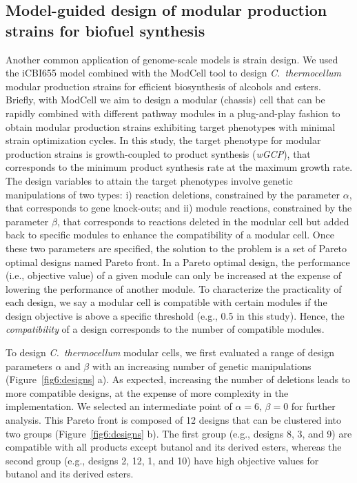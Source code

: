 \subsection{Model-guided design of modular production strains for biofuel synthesis}

Another common application of genome-scale models is strain design. \citep{long2015, ng2015, maranas2016, wang2018, garcia2019, garcia2019b, garcia2019c}
We used the iCBI655 model combined with the ModCell tool\citep{garcia2020b} to design \textit{C.~thermocellum} modular production strains for efficient biosynthesis of alcohols and esters.
Briefly, with ModCell we aim to design a modular (chassis) cell that can be rapidly combined with different pathway modules in a plug-and-play fashion to obtain modular production strains exhibiting target phenotypes with minimal strain optimization cycles.
In this study, the target phenotype for modular production strains is growth-coupled to product synthesis (\textit{wGCP}), that corresponds to the minimum product synthesis rate at the maximum growth rate.
The design variables to attain the target phenotypes involve genetic manipulations of two types: i) reaction deletions, constrained by the parameter $\alpha$, that corresponds to gene knock-outs; and ii) module reactions, constrained by the parameter $\beta$, that corresponds to reactions deleted in the modular cell but added back to specific modules to enhance the compatibility of a modular cell. Once these two parameters are specified, the solution to the problem is a set of Pareto optimal designs named Pareto front. In a Pareto optimal design, the performance (i.e., objective value) of a given module can only be increased at the expense of lowering the performance of another module.
To characterize the practicality of each design, we say a modular cell is compatible with certain modules if the design objective is above a specific threshold (e.g., 0.5 in this study). Hence, the \emph{compatibility} of a design corresponds to the number of compatible modules.

To design \textit{C.~thermocellum} modular cells, we first evaluated a range of design parameters $\alpha$ and $\beta$ with an increasing number of genetic manipulations (Figure~\ref{fig6:designs} a).
As expected, increasing the number of deletions leads to more compatible designs, at the expense of more complexity in the implementation.
We selected an intermediate point of $\alpha=6,\, \beta=0$ for further analysis.
This Pareto front is composed of 12 designs that can be clustered into two groups (Figure~\ref{fig6:designs} b).
The first group (e.g., designs 8, 3, and 9) are compatible with all products except butanol and its derived esters, whereas the second group (e.g., designs 2, 12, 1, and 10) have high objective values for butanol and its derived esters.

